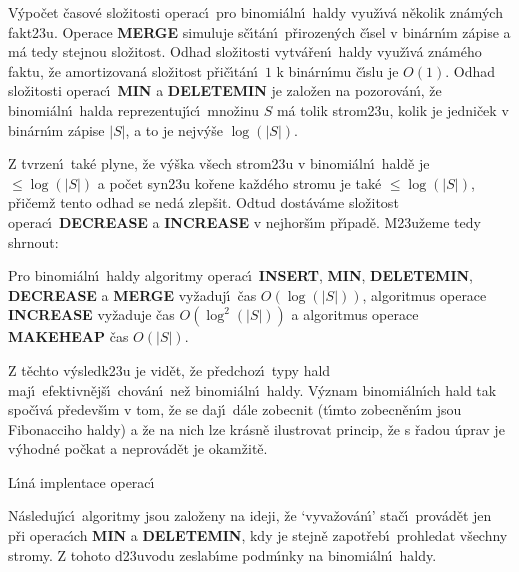 \flushpar V\'ypo\v cet \v casov\'e slo\v zitosti operac\'\i\ pro binomi\'aln\'\i\ haldy 
vyu\v z\'\i v\'a n\v ekolik zn\'am\'ych fakt\accent23u.  Ope\-race {\bf MERGE }
simuluje s\v c\'\i t\'an\'\i\ p\v rirozen\'ych \v c\'\i sel v bin\'arn\'\i m z\'apise a m\'a 
tedy stejnou slo\v zitost.  Odhad slo\v zitosti vytv\'a\v ren\'\i\ haldy vyu\v z\'\i v\'a 
zn\'am\'eho faktu, \v ze amortizovan\'a slo\v zitost p\v ri\v c\'\i t\'an\'\i\ $
1$  
k bin\'arn\'\i mu \v c\'\i slu je $O(1)$.  
Odhad slo\v zitosti operac\'\i\ {\bf MIN} a {\bf DELETEMIN} je zalo\v zen na 
pozorov\'an\'\i , \v ze binomi\'aln\'\i\ halda reprezentuj\'\i c\'\i\ mno\v zinu $
S$ m\'a 
tolik strom\accent23u, kolik je jedni\v cek v bin\'arn\'\i m z\'apise $
|S|$, a 
to je nejv\'y\v se $\log(|S|)$.  
\medskip

\flushpar Z tvrzen\'\i\ tak\'e plyne, \v ze v\'y\v ska v\v sech strom\accent23u v 
binomi\'aln\'\i\ hald\v e je $\le\log(|S|)$ a po\v cet syn\accent23u 
ko\v rene ka\v zd\'eho stromu je 
tak\'e $\le\log(|S|)$, p\v ri\v cem\v z tento odhad se ned\'a zlep\v sit. Odtud 
dost\'av\'ame slo\v zitost operac\'\i\ {\bf DECREASE} a {\bf INCREASE} v nejhor\v s\'\i m 
p\v r\'\i pad\v e. M\accent23u\v zeme tedy shrnout:
\medskip


Pro binomi\'aln\'\i\ haldy algoritmy operac\'\i\ 
{\bf IN\-SERT}, {\bf MIN}, {\bf DELETEMIN}, {\bf DECREASE} a {\bf MERGE  }
vy\-\v za\-duj\'\i\ \v cas $O(\log(|S|))$, algoritmus operace {\bf INCRE\-ASE }
vy\-\v za\-duje \v cas $O(\log^2(|S|))$ a algoritmus operace {\bf MAKEHEAP 
}\v cas $O(|S|)$.
\endproclaim
\medskip


\flushpar Z t\v echto v\'ysledk\accent23u je vid\v et, \v ze p\v redchoz\'\i\ 
typy hald maj\'\i\ efektivn\v ej\v s\'\i\ chov\'an\'\i\ ne\v z binomi\'aln\'\i\ haldy. 
V\'yznam binomi\'aln\'\i ch hald tak spo\-\v c\'\i\-v\'a p\v redev\v s\'\i m v 
tom, \v ze se daj\'\i\ d\'ale zobecnit (t\'\i mto zobecn\v en\'\i m jsou Fibonacciho 
haldy) a \v ze na nich lze kr\'asn\v e 
ilustrovat princip, \v ze s \v radou \'uprav je v\'yhodn\'e po\v ckat 
a neprov\'ad\v et je okam\v zit\v e.
\bigskip

\head
L\'\i n\'a implentace operac\'\i
\endhead

\flushpar N\'asleduj\'\i c\'\i\ algoritmy jsou zalo\v zeny na ideji, \v ze 
`vyva\v zov\'an\'\i ' sta\v c\'\i\ prov\'ad\v et jen p\v ri operac\'\i ch {\bf MIN} a 
{\bf DELETEMIN}, kdy je stejn\v e zapot\v reb\'\i\ prohledat v\v sechny 
stromy. Z tohoto d\accent23uvodu zeslab\'\i me podm\'\i nky na 
binomi\'aln\'\i\ haldy.
\medskip

